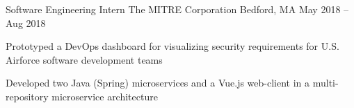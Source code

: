 \begin{cventries}
  \cventry
  {Software Engineering Intern}
  {The MITRE Corporation}
  {Bedford, MA}
  {May 2018 -- Aug 2018}
  {
    \begin{cvitems}
      \item {Prototyped a DevOps dashboard for visualizing security requirements for U.S. Airforce software development teams}
      \item {Developed two Java (Spring) microservices and a Vue.js web-client in a multi-repository microservice architecture}
    \end{cvitems}
  }




\end{cventries}